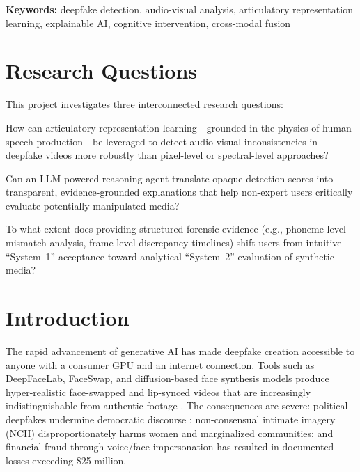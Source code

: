 \documentclass[11pt,a4paper]{article}
\begin{document}
\textbf{Keywords:} deepfake detection, audio-visual analysis, articulatory representation learning, explainable AI, cognitive intervention, cross-modal fusion


\section{Research Questions}

This project investigates three interconnected research questions:

\begin{description}[leftmargin=1.5em, labelindent=0em]
    \item[\textbf{RQ1.}] How can articulatory representation learning---grounded in the physics of human speech production---be leveraged to detect audio-visual inconsistencies in deepfake videos more robustly than pixel-level or spectral-level approaches?

    \item[\textbf{RQ2.}] Can an LLM-powered reasoning agent translate opaque detection scores into transparent, evidence-grounded explanations that help non-expert users critically evaluate potentially manipulated media?

    \item[\textbf{RQ3.}] To what extent does providing structured forensic evidence (e.g., phoneme-level mismatch analysis, frame-level discrepancy timelines) shift users from intuitive ``System~1'' acceptance toward analytical ``System~2'' evaluation of synthetic media?
\end{description}


\section{Introduction}

The rapid advancement of generative AI has made deepfake creation accessible to anyone with a consumer GPU and an internet connection. Tools such as DeepFaceLab, FaceSwap, and diffusion-based face synthesis models produce hyper-realistic face-swapped and lip-synced videos that are increasingly indistinguishable from authentic footage \citep{tolosana2020deepfakes, mirsky2021creation}. The consequences are severe: political deepfakes undermine democratic discourse \citep{chesney2019deep}; non-consensual intimate imagery (NCII) disproportionately harms women and marginalized communities; and financial fraud through voice/face impersonation has resulted in documented losses exceeding \$25 million.
\end{document}
